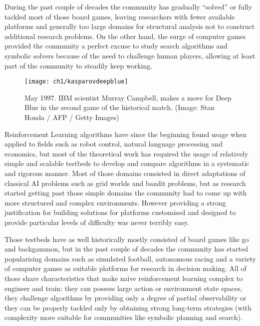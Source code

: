 During the past couple of decades the community has gradually ``solved'' or
fully tackled most of those board games, leaving researchers with fewer
available platforms and generally too large domains for structural analysis not
to construct additional research problems. On the other hand, the surge of
computer games provided the community a perfect excuse to study search
algorithms and symbolic solvers because of the need to challenge human players,
allowing at least part of the community to steadily keep working.

\begin{figure}[h]
    \centering
    \texttt{[image: ch1/kasparovdeepblue]}
    \caption{May 1997. IBM scientist Murray Campbell, makes a move for Deep Blue
      in the second game of the historical match. (Image: Stan Honda / AFP /
      Getty Images)}
    \label{fig:kasparovdeepblue}
\end{figure}

Reinforcement Learning algorithms have since the beginning found usage when
applied to fields such as robot control, natural language processing and
economics, but most of the theoretical work has required the usage of relatively
simple and scalable testbeds to develop and compare algorithms in a systematic
and rigorous manner. Most of those domains consisted in direct adaptations of
classical AI problems such as grid worlds and bandit problems, but as research
started getting past those simple domains the community had to come up with more
structured and complex environments. However providing a strong justification
for building solutions for platforms customised and designed to provide
particular levels of difficulty was never terribly easy.

Those testbeds have as well historically mostly consisted of board games like go
and backgammon, but in the past couple of decades the community has started
popularising domains such as simulated football, autonomous racing and a variety
of computer games as suitable platforms for research in decision making. All of
those share characteristics that make naive reinforcement learning complex to
engineer and train: they can possess large action or environment state spaces,
they challenge algorithms by providing only a degree of partial observability or
they can be properly tackled only by obtaining strong long-term strategies (with
complexity more suitable for communities like symbolic planning and search).

